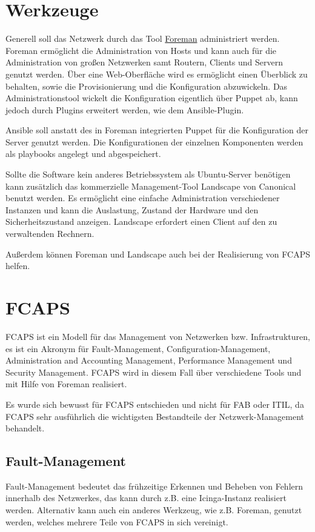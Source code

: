 \section{Werkzeuge}
Generell soll das Netzwerk durch das Tool \href{www.theforeman.org}{Foreman} administriert werden. Foreman ermöglicht die Administration von Hosts und kann auch für die Administration von großen Netzwerken samt Routern, Clients und Servern genutzt werden. Über eine Web-Oberfläche wird es ermöglicht einen Überblick zu behalten, sowie die Provisionierung und die Konfiguration abzuwickeln.
Das Administrationstool wickelt die Konfiguration eigentlich über Puppet ab, kann jedoch durch Plugins erweitert werden, wie dem Ansible-Plugin. 

Ansible soll anstatt des in Foreman integrierten Puppet für die Konfiguration der Server genutzt werden. Die Konfigurationen der einzelnen Komponenten werden als playbooks angelegt und abgespeichert.

Sollte die Software kein anderes Betriebssystem als Ubuntu-Server benötigen kann zusätzlich das kommerzielle Management-Tool Landscape von Canonical benutzt werden. Es ermöglicht eine einfache Administration verschiedener Instanzen und kann die Auslastung, Zustand der Hardware und den Sicherheitszustand anzeigen. Landscape  erfordert einen Client auf den zu verwaltenden Rechnern.

Außerdem können Foreman und Landscape auch bei der Realisierung von FCAPS helfen.

\newpage

\section{FCAPS}
FCAPS ist ein Modell für das Management von Netzwerken bzw. Infrastrukturen, es ist ein Akronym für Fault-Management, Configuration-Management, Administration and Accounting Management, Performance Management und Security Management. FCAPS wird in diesem Fall über verschiedene Tools und mit Hilfe von Foreman realisiert.

Es wurde sich bewusst für FCAPS entschieden und nicht für FAB oder ITIL, da FCAPS sehr ausführlich die wichtigsten Bestandteile der Netzwerk-Management behandelt.


\subsection{Fault-Management}
Fault-Management bedeutet das frühzeitige Erkennen und Beheben von Fehlern innerhalb des Netzwerkes, das kann durch z.B. eine Icinga-Instanz realisiert werden. Alternativ kann auch ein anderes Werkzeug, wie z.B. Foreman, genutzt werden, welches mehrere Teile von FCAPS in sich vereinigt.

